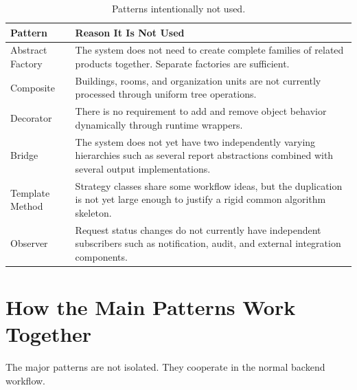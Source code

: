 \documentclass[12pt,a4paper]{article}
\begin{document}
\begin{table}[H]
    \centering
    \small
    \caption{Patterns intentionally not used.}
    \begin{tabularx}{\textwidth}{L{3.4cm}Y}
        \toprule
        \textbf{Pattern} & \textbf{Reason It Is Not Used} \\
        \midrule

        Abstract Factory
        & The system does not need to create complete families of related
        products together. Separate factories are sufficient. \\

        Composite
        & Buildings, rooms, and organization units are not currently processed
        through uniform tree operations. \\

        Decorator
        & There is no requirement to add and remove object behavior dynamically
        through runtime wrappers. \\

        Bridge
        & The system does not yet have two independently varying hierarchies
        such as several report abstractions combined with several output
        implementations. \\

        Template Method
        & Strategy classes share some workflow ideas, but the duplication is
        not yet large enough to justify a rigid common algorithm skeleton. \\

        Observer
        & Request status changes do not currently have independent subscribers
        such as notification, audit, and external integration components. \\

        \bottomrule
    \end{tabularx}
\end{table}

\section{How the Main Patterns Work Together}

The major patterns are not isolated. They cooperate in the normal backend
workflow.
\end{document}
